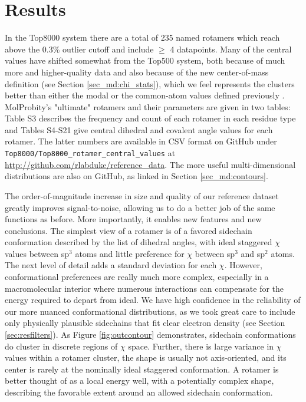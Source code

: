 \section{Results}
In the Top8000 system there are a total of 235 named rotamers which reach above the 0.3\% outlier cutoff and include $\ge$ 4 datapoints. Many of the central values have shifted somewhat from the Top500 system, both because of much more and higher-quality data and also because of the new center-of-mass definition (see Section \ref{sec_md:chi_stats}), which we feel represents the clusters better than either the modal or the common-atom values defined previously \cite{lovell2000penultimate}. MolProbity's "ultimate" rotamers and their parameters are given in two tables: Table S3 describes the frequency and count of each rotamer in each residue type and Tables S4-S21 give central dihedral and covalent angle values for each rotamer. The latter numbers are available in CSV format on GitHub under \texttt{Top8000/Top8000\_rotamer\_central\_values} at \url{http://github.com/rlabduke/reference_data}. The more useful multi-dimensional distributions are also on GitHub, as linked in Section \ref{sec_md:contours}.

The order-of-magnitude increase in size and quality of our reference dataset greatly improves signal-to-noise, allowing us to do a better job of the same functions as before. More importantly, it enables new features and new conclusions. The simplest view of a rotamer is of a favored sidechain conformation described by the list of dihedral angles, with ideal staggered $\chi$ values between sp$^{3}$ atoms and little preference for $\chi$ between sp$^{3}$ and sp$^{2}$ atoms. The next level of detail adds a standard deviation for each $\chi$. However, conformational preferences are really much more complex, especially in a macromolecular interior where numerous interactions can compensate for the energy required to depart from ideal. We have high confidence in the reliability of our more nuanced conformational distributions, as we took great care to include only physically plausible sidechains that fit clear electron density (see Section \ref{sec:resfilters}). As Figure \ref{fig:outcontour} demonstrates, sidechain conformations do cluster in discrete regions of $\chi$ space. Further, there is large variance in $\chi$ values within a rotamer cluster, the shape is usually not axis-oriented, and its center is rarely at the nominally ideal staggered conformation. A rotamer is better thought of as a local energy well, with a potentially complex shape, describing the favorable extent around an allowed sidechain conformation.

